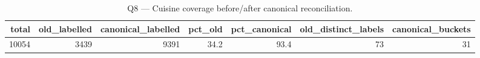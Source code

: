 \begin{table}[ht]
\centering
\caption{Q8 — Cuisine coverage before/after canonical reconciliation.}
\label{tab:q8_cuisine_coverage}
{\tiny
\begin{tabular}{rrrrrrr}
\toprule
total & old\_labelled & canonical\_labelled & pct\_old & pct\_canonical & old\_distinct\_labels & canonical\_buckets \\
\midrule
10054 & 3439 & 9391 & 34.2 & 93.4 & 73 & 31 \\
\bottomrule
\end{tabular}
}
\end{table}
